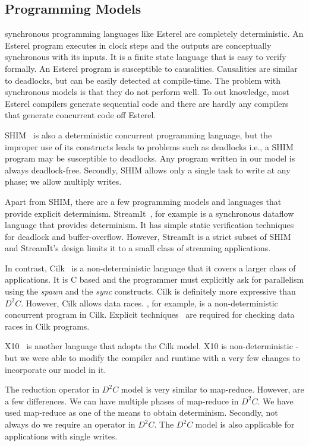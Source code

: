 \documentclass[10pt, conference, compsocconf]{IEEEtran}
\begin{document}
\subsection{Programming Models} 
synchronous programming languages like Esterel are completely deterministic. An Esterel program 
executes in clock steps and the outputs are conceptually synchronous with its inputs. 
It is a finite state language that is easy to verify formally. An Esterel program is susceptible 
to causalities. Causalities are similar to deadlocks, but can be easily detected at compile-time. 
The problem with synchronous models is that they do not perform well. To out knowledge, 
most Esterel compilers generate sequential code and there are hardly any compilers that generate 
concurrent code off Esterel. 

 
SHIM~\cite{edwards2005shim2,tardieu2006scheduling-independent} is also
a deterministic concurrent programming language, but the improper use
of its constructs leads to problems such as deadlocks i.e., a SHIM program
may be susceptible to deadlocks. Any program written in our model is always
deadlock-free. Secondly, SHIM allows only a single task to write at any phase;
we allow multiply writes.

 
Apart from SHIM, there are  a few programming models and languages 
that provide explicit determinism. StreamIt~\cite{thies2001streamit}, for 
example is a synchronous dataflow language that provides determinism. It 
has simple static verification techniques for deadlock and buffer-overflow. 
However, StreamIt is a strict subset of SHIM and StreamIt's design 
limits it to a small class of streaming applications. 
 


In contrast, 
Cilk~\cite{blumofe1995cilk} is a non-deterministic language that it covers a larger
class of applications. It is C based
and the programmer must explicitly ask for parallelism using 
the \emph{spawn} and the \emph{sync} constructs. 
Cilk is definitely more
expressive than $D^2C$.
However, Cilk allows data races. 
, for example,
is a non-deterministic concurrent program in Cilk. 
Explicit techniques~\cite{cheng1998detecting} are
required for checking data races in Cilk programs.  

X10~\cite{charles2005x10,saraswat2007x10} is another  language
that adopts the Cilk model. X10 is non-deterministic - but we
were able to modify the compiler and runtime with a very few
changes to incorporate our model in it.

The reduction operator  in $D^2C$  model is very similar
to map-reduce. However, are a few differences. We can have multiple
phases of map-reduce in $D^2C$. We have used map-reduce as one
of the means to obtain determinism. Secondly, not always
do we require an operator in $D^2C$. The $D^2C$ model is 
also applicable for applications with single writes.
\end{document}
